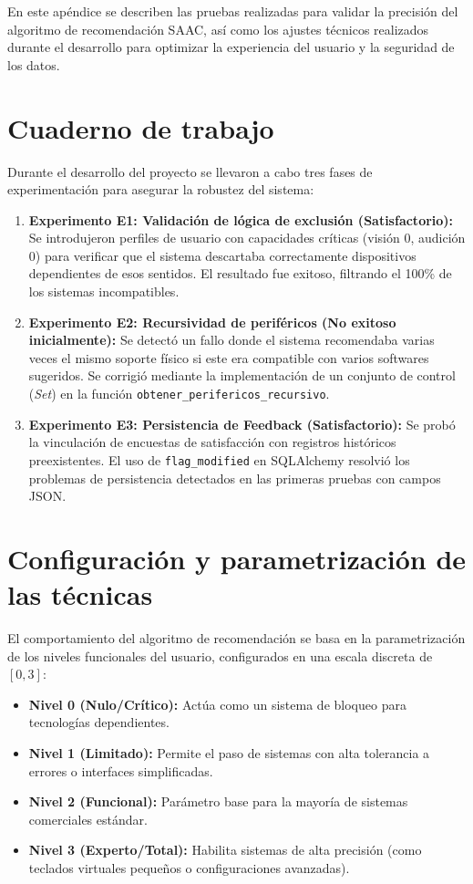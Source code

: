 
En este apéndice se describen las pruebas realizadas para validar la precisión del algoritmo de recomendación SAAC, así como los ajustes técnicos realizados durante el desarrollo para optimizar la experiencia del usuario y la seguridad de los datos.

\section{Cuaderno de trabajo}
Durante el desarrollo del proyecto se llevaron a cabo tres fases de experimentación para asegurar la robustez del sistema:

\begin{enumerate}
    	\item \textbf{Experimento E1: Validación de lógica de exclusión (Satisfactorio):} Se introdujeron perfiles de usuario con capacidades críticas (visión 0, audición 0) para verificar que el sistema descartaba correctamente dispositivos dependientes de esos sentidos. El resultado fue 			exitoso, filtrando el 100\% de los sistemas incompatibles.
    	\item \textbf{Experimento E2: Recursividad de periféricos (No exitoso inicialmente):} Se detectó un fallo donde el sistema recomendaba varias veces el mismo soporte físico si este era compatible con varios softwares sugeridos. Se corrigió mediante la implementación de un 			conjunto de control (\textit{Set}) en la función \texttt{obtener\_perifericos\_recursivo}.
    	\item \textbf{Experimento E3: Persistencia de Feedback (Satisfactorio):} Se probó la vinculación de encuestas de satisfacción con registros históricos preexistentes. El uso de \texttt{flag\_modified} en SQLAlchemy resolvió los problemas de persistencia detectados en las primeras 			pruebas con campos JSON.
\end{enumerate}

\section{Configuración y parametrización de las técnicas}
El comportamiento del algoritmo de recomendación se basa en la parametrización de los niveles funcionales del usuario, configurados en una escala discreta de $[0, 3]$:

\begin{itemize}
    	\item \textbf{Nivel 0 (Nulo/Crítico):} Actúa como un sistema de bloqueo para tecnologías dependientes.
    	\item \textbf{Nivel 1 (Limitado):} Permite el paso de sistemas con alta tolerancia a errores o interfaces simplificadas.
    	\item \textbf{Nivel 2 (Funcional):} Parámetro base para la mayoría de sistemas comerciales estándar.
    	\item \textbf{Nivel 3 (Experto/Total):} Habilita sistemas de alta precisión (como teclados virtuales pequeños o configuraciones avanzadas).
\end{itemize}

